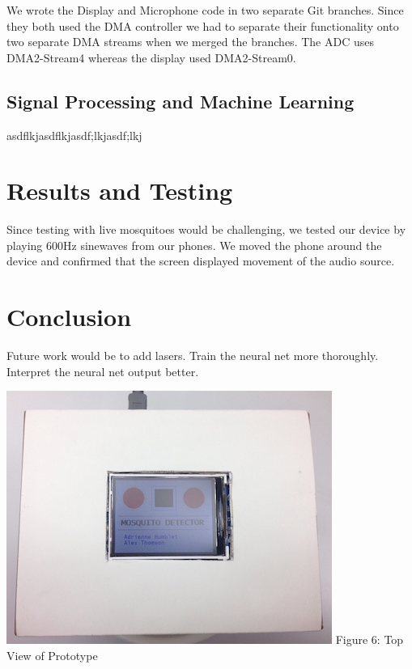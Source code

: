 \documentclass[twoside]{article}
\begin{document}
\begin{multicols}{2}
We wrote the Display and Microphone code in two separate Git branches. Since they both used the DMA controller we had to separate their functionality onto two separate DMA streams when we merged the branches. The ADC uses DMA2-Stream4 whereas the display used DMA2-Stream0.

\subsection{Signal Processing and Machine Learning}
asdflkjasdflkjasdf;lkjasdf;lkj



\section{Results and Testing}

Since testing with live mosquitoes would be challenging, we tested our device by playing 600Hz sinewaves from our phones. We moved the phone around the device and confirmed that the screen displayed movement of the audio source. 

\section{Conclusion}

Future work would be to add lasers. Train the neural net more thoroughly. Interpret the neural net output better. 

\begin{center}
\includegraphics[scale=0.40]{topView.png}
\newline Figure 6:  Top View of Prototype
\end{center}


\end{multicols}
\end{document}
